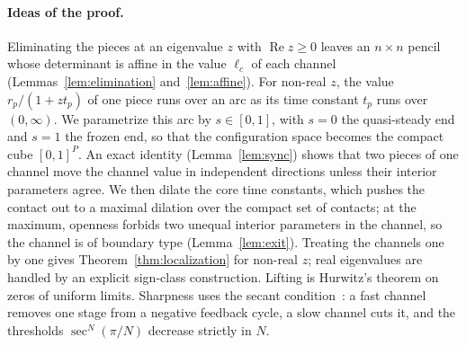 \documentclass[11pt,a4paper]{article}
\theoremstyle{plain}
\theoremstyle{definition}
\theoremstyle{remark}
\newcommand{\Real}{\operatorname{Re}}
\begin{document}
\paragraph{Ideas of the proof.} Eliminating the pieces at an eigenvalue $z$ with
$\Real z\ge0$ leaves an $n\times n$ pencil whose determinant is affine in the value
$\ell_c$ of each channel (Lemmas~\ref{lem:elimination} and~\ref{lem:affine}). For non-real
$z$, the value $r_p/(1+zt_p)$ of one piece runs over an arc as its time constant $t_p$ runs
over $(0,\infty)$. We parametrize this arc by $s\in[0,1]$, with $s=0$ the quasi-steady end
and $s=1$ the frozen end, so that the configuration space becomes the compact cube
$[0,1]^P$. An exact identity (Lemma~\ref{lem:sync}) shows that two pieces of one channel move
the channel value in independent directions unless their interior parameters agree. We then dilate
the core time constants, which pushes the contact out to a maximal dilation over the compact
set of contacts; at the maximum, openness forbids two unequal interior parameters in the
channel, so the channel is of boundary type (Lemma~\ref{lem:exit}). Treating the channels
one by one gives Theorem~\ref{thm:localization} for non-real $z$; real eigenvalues are
handled by an explicit sign-class construction. Lifting is Hurwitz's theorem on zeros of
uniform limits. Sharpness uses the secant condition~\cite{tyson1978,thron1991,arcak2006}: a
fast channel removes one stage from a negative feedback cycle, a slow channel cuts it, and
the thresholds $\sec^N(\pi/N)$ decrease strictly in $N$.
\end{document}
